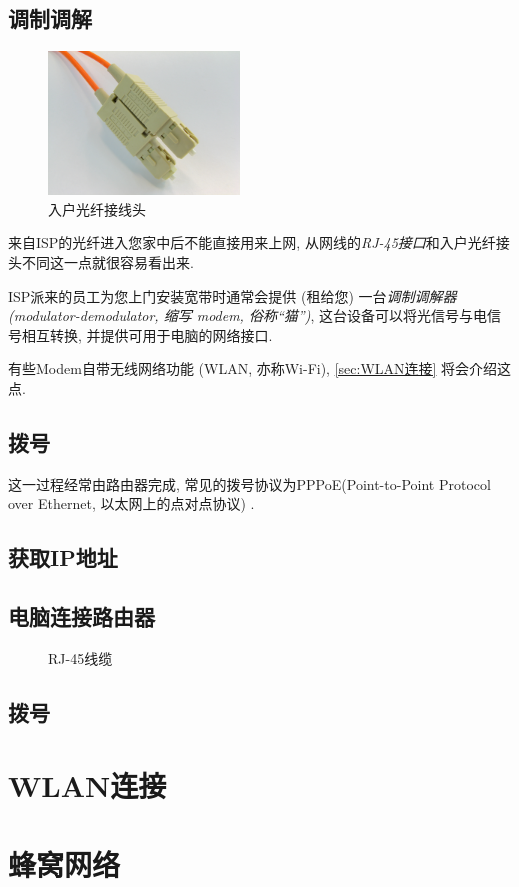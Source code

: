 \subsection{调制调解}

\begin{figure}[htbp]
    \centering
    \includegraphics[width=2in]{media/SC-optical-fiber-connector-hdr-0a.jpg}
    \caption{入户光纤接线头
    \cite{OpticalFiberConnector}
    }
\end{figure}

来自ISP的光纤进入您家中后不能直接用来上网, 从网线的\textit{RJ-45接口}和入户光纤接头不同这一点就很容易看出来.

ISP派来的员工为您上门安装宽带时通常会提供 (租给您) 一台\textit{调制调解器 (modulator-demodulator, 缩写 modem, 俗称``猫'')}, 这台设备可以将光信号与电信号相互转换, 并提供可用于电脑的网络接口.

有些Modem自带无线网络功能 (WLAN, 亦称Wi-Fi), \autoref*{sec:WLAN连接} 将会介绍这点.



\subsection{拨号}

这一过程经常由路由器完成, 常见的拨号协议为PPPoE(Point-to-Point Protocol over Ethernet, 以太网上的点对点协议) .



\subsection{获取IP地址}


\subsection{电脑连接路由器}

\begin{figure}[htbp]
    \centering
    
    \caption{RJ-45线缆
    \cite{EthernetPlugGrey}
    }
\end{figure}

\subsection{拨号}


\section{WLAN连接}\label{sec:WLAN连接}


\section{蜂窝网络}


\endinput